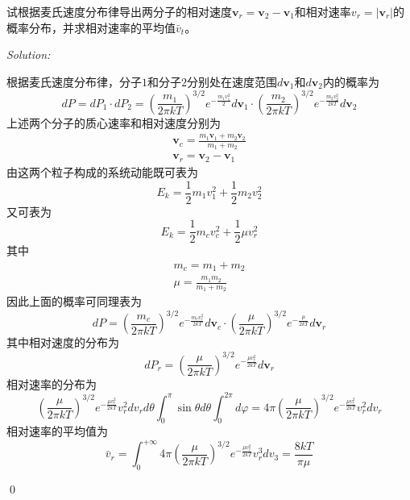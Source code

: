 \documentclass[12pt,a4paper]{article}
\newenvironment{problem}[2][Problem]{\begin{trivlist}
\item[\hskip \labelsep {\bfseries #1}\hskip \labelsep {\bfseries #2.}]}{\end{trivlist}}
\newenvironment{sol}
    {\emph{Solution:}
    }
    {
    \qed
    }
\begin{document}
\begin{problem}{7.12}
试根据麦氏速度分布律导出两分子的相对速度$\bm{v}_r=\bm{v}_2-\bm{v}_1$和相对速率$v_r=|\bm{v}_r|$的概率分布，并求相对速率的平均值$\bar{v}_t$。
\end{problem}
\begin{sol}
根据麦氏速度分布律，分子$1$和分子$2$分别处在速度范围$d\bm{v}_1$和$d\bm{v}_2$内的概率为
\begin{equation}
dP=dP_1\cdot dP_2=\left(\frac{m_1}{2\pi kT}\right)^{3/2}e^{-\frac{m_1v_1^2}{2}}d\bm{v}_1\cdot\left(\frac{m_2}{2\pi kT}\right)^{3/2}e^{-\frac{m_2v_2^2}{2kT}}d\bm{v}_2
\end{equation}
上述两个分子的质心速率和相对速度分别为
\begin{gather}
\bm{v}_c=\frac{m_1\bm{v}_1+m_2\bm{v}_2}{m_1+m_2}\\
\bm{v}_r=\bm{v}_2-\bm{v}_1
\end{gather}
由这两个粒子构成的系统动能既可表为
\begin{equation}
E_k=\frac{1}{2}m_1v_1^2+\frac{1}{2}m_2v_2^2
\end{equation}
又可表为
\begin{equation}
E_k=\frac{1}{2}m_cv_c^2+\frac{1}{2}\mu v_r^2
\end{equation}
其中
\begin{gather}
m_c=m_1+m_2\\
\mu=\frac{m_1m_2}{m_1+m_2}
\end{gather}
因此上面的概率可同理表为
\begin{equation}
dP=\left(\frac{m_c}{2\pi kT}\right)^{3/2}e^{-\frac{m_cv_c^2}{2kT}}d\bm{v}_c\cdot\left(\frac{\mu}{2\pi kT}\right)^{3/2}e^{-\frac{\mu}{2kT}}d\bm{v}_r
\end{equation}
其中相对速度的分布为
\begin{equation}
dP_r=\left(\frac{\mu}{2\pi kT}\right)^{3/2}e^{-\frac{\mu v_r^2}{2kT}}d\bm{v}_r
\end{equation}
相对速率的分布为
\begin{equation}
\left(\frac{\mu}{2\pi kT}\right)^{3/2}e^{-\frac{\mu v_r^2}{2kT}}v_r^2dv_{r}d\theta\int_0^{\pi}\sin\theta d\theta\int_0^{2\pi}d\varphi=4\pi\left(\frac{\mu}{2\pi kT}\right)^{3/2}e^{-\frac{\mu v_r^2}{2kT}}v_r^2dv_{r}
\end{equation}
相对速率的平均值为
\begin{equation}
\bar{v}_r=\int_0^{+\infty}4\pi\left(\frac{\mu}{2\pi kT}\right)^{3/2}e^{-\frac{\mu v_r^2}{2kT}}v_r^3dv_3=\frac{8kT}{\pi\mu}
\end{equation}
\end{sol}
\end{document}
